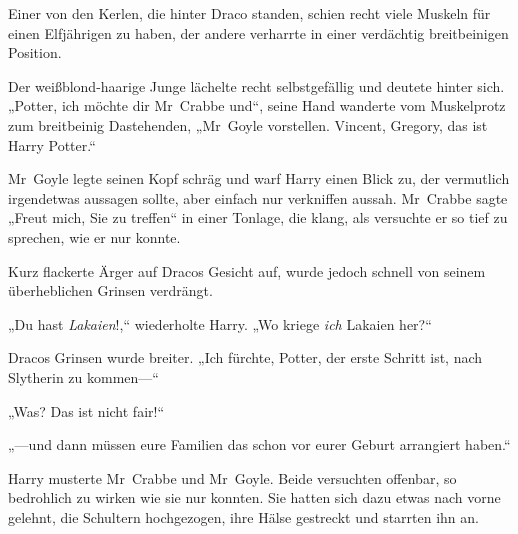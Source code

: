 Einer von den Kerlen, die hinter Draco standen, schien recht viele Muskeln für einen Elfjährigen zu haben, der andere verharrte in einer verdächtig breitbeinigen Position.

Der weißblond-haarige Junge lächelte recht selbstgefällig und deutete hinter sich. „Potter, ich möchte dir Mr~Crabbe und“, seine Hand wanderte vom Muskelprotz zum breitbeinig Dastehenden, „Mr~Goyle vorstellen. Vincent, Gregory, das ist Harry Potter.“

Mr~Goyle legte seinen Kopf schräg und warf Harry einen Blick zu, der vermutlich irgendetwas aussagen sollte, aber einfach nur verkniffen aussah. Mr~Crabbe sagte „Freut mich, Sie zu treffen“ in einer Tonlage, die klang, als versuchte er so tief zu sprechen, wie er nur konnte.

Kurz flackerte Ärger auf Dracos Gesicht auf, wurde jedoch schnell von seinem überheblichen Grinsen verdrängt.

„Du hast \emph{Lakaien}!,“ wiederholte Harry. „Wo kriege \emph{ich} Lakaien her?“

Dracos Grinsen wurde breiter. „Ich fürchte, Potter, der erste Schritt ist, nach Slytherin zu kommen—“

„Was? Das ist nicht fair!“

„—und dann müssen eure Familien das schon vor eurer Geburt arrangiert haben.“

Harry musterte Mr~Crabbe und Mr~Goyle. Beide versuchten offenbar, so bedrohlich zu wirken wie sie nur konnten. Sie hatten sich dazu etwas nach vorne gelehnt, die Schultern hochgezogen, ihre Hälse gestreckt und starrten ihn an.

